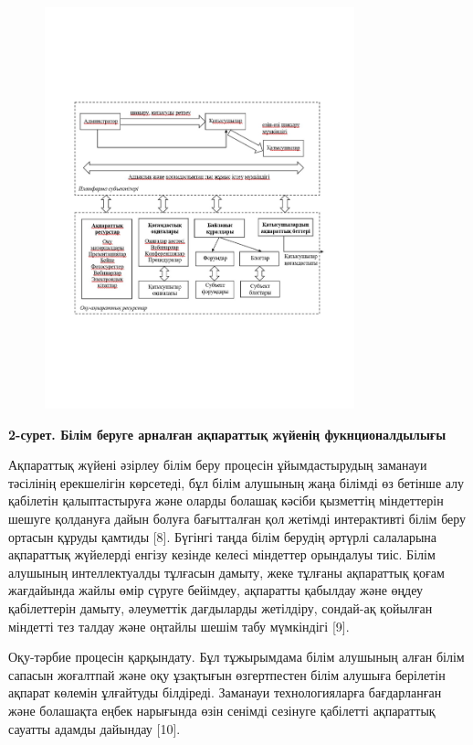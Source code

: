 \begin{figure}[H]
	\centering
	\includegraphics[width=0.8\textwidth]{media/ict/image100}
	\caption*{}
\end{figure}


{\bfseries 2-сурет. Білім беруге арналған ақпараттық жүйенің
фукнционалдылығы}

Ақпараттық жүйені әзірлеу білім беру процесін ұйымдастырудың заманауи
тәсілінің ерекшелігін көрсетеді, бұл білім алушының жаңа білімді өз
бетінше алу қабілетін қалыптастыруға және оларды болашақ кәсіби
қызметтің міндеттерін шешуге қолдануға дайын болуға бағытталған қол
жетімді интерактивті білім беру ортасын құруды қамтиды {[}8{]}. Бүгінгі
таңда білім берудің әртүрлі салаларына ақпараттық жүйелерді енгізу
кезінде келесі міндеттер орындалуы тиіс. Білім алушының интеллектуалды
тұлғасын дамыту, жеке тұлғаны ақпараттық қоғам жағдайында жайлы өмір
сүруге бейімдеу, ақпаратты қабылдау және өңдеу қабілеттерін дамыту,
әлеуметтік дағдыларды жетілдіру, сондай-ақ қойылған міндетті тез талдау
және оңтайлы шешім табу мүмкіндігі {[}9{]}.

Оқу-тәрбие процесін қарқындату. Бұл тұжырымдама білім алушының алған
білім сапасын жоғалтпай және оқу ұзақтығын өзгертпестен білім алушыға
берілетін ақпарат көлемін ұлғайтуды білдіреді. Заманауи технологияларға
бағдарланған және болашақта еңбек нарығында өзін сенімді сезінуге
қабілетті ақпараттық сауатты адамды дайындау {[}10{]}.

